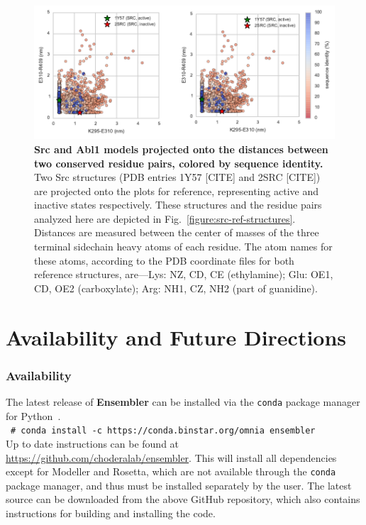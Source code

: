 \documentclass[aps,pre,twocolumn,nofootinbib,superscriptaddress,linenumbers]{revtex4-1}
\newcommand{\shellcmd}[1]{\\\ \texttt{\scriptsize\# #1}\\}
\begin{document}
\begin{figure}

    \includegraphics[width=1.0\columnwidth]{residue_pair_distances/src_abl_combined/distances.pdf}

    \caption{{\bf Src and Abl1 models projected onto the distances between two conserved residue pairs, colored by sequence identity.}
    Two Src structures (PDB entries 1Y57 [CITE] and 2SRC [CITE]) are projected onto the plots for reference, representing active and inactive states respectively.
    These structures and the residue pairs analyzed here are depicted in Fig.~\ref{figure:src-ref-structures}.
    Distances are measured between the center of masses of the three terminal sidechain heavy atoms of each residue.
    The atom names for these atoms, according to the PDB coordinate files for both reference structures, are---Lys: NZ, CD, CE (ethylamine); Glu: OE1, CD, OE2 (carboxylate); Arg: NH1, CZ, NH2 (part of guanidine).
    }
  \label{figure:pair-distances}
\end{figure}

\section{Availability and Future Directions}
\label{section:availability}

\subsubsection*{Availability}

The latest release of {\bf Ensembler} can be installed via the {\tt conda} package manager for Python~\cite{conda}.
\shellcmd{conda install -c https://conda.binstar.org/omnia ensembler}
Up to date instructions can be found at \url{https://github.com/choderalab/ensembler}.
This will install all dependencies except for Modeller and Rosetta, which are not available through the {\tt conda} package manager, and thus must be installed separately by the user.
The latest source can be downloaded from the above GitHub repository, which also contains instructions for building and installing the code.
\end{document}
